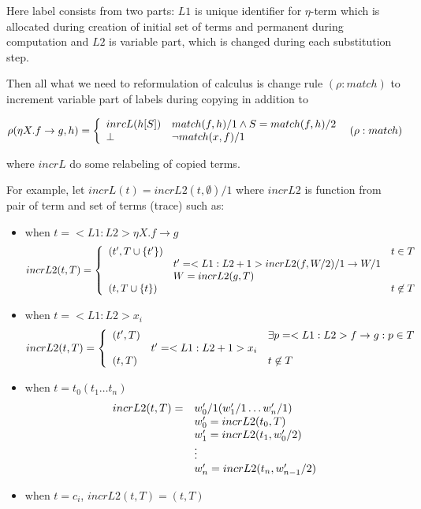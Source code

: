 \documentclass[10pt]{article}
\begin{document}
   Here label consists from two parts: $L1$ is unique identifier for $\eta$-term which is
allocated during creation of initial set of terms and permanent during computation and
$L2$ is variable part, which is changed during each substitution step.
   
 Then all what we need to reformulation of calculus is change rule $(\rho:match)$ to
increment variable part of labels during copying in addition to 

$$
{
 \rho({\eta X. f\to g},h) = \left\{
    \begin{array}{l l}
      inrcL(h[S])  &  match(f,h)/1 \land S=match(f,h)/2  \\
      \bot         & \neg match(x,f)/1 \\       
    \end{array}
    \right.   
}\,\,\,\,{(\rho:match)}  
$$

where $incrL$ do some relabeling of copied terms.

For example, let $incrL(t)=incrL2(t,\emptyset)/1$ where $incrL2$ is function
from pair of term and set of terms (trace) such as:

\begin{itemize}
 \item when $t=<L1:L2>\eta X . f \to g$
$$
 incrL2(t,T) = 
 \left\{
 \begin{array}{l l l}
    (t',T \cup \{t'\}) &  &  t \in T \\
       & t'=<L1:L2+1> incrL2(f,W/2)/1 \to W/1 & \\
       & W=incrL2(g,T) &  \\
    (t, T \cup \{t\}) &  & t \not\in T \\
 \end{array}
 \right.
$$
 \item when $t=<L1:L2>x_{i}$
$$
 incrL2(t,T) = 
 \left\{
 \begin{array}{l l l}
    (t', T) &  & \exists p=<L1:L2>f\to g : p \in T \\
       & t'=<L1:L2+1>x_{i} & \\
    (t,  T) &  & t \not\in T \\
 \end{array}
 \right. 
$$
 \item when $t=t_{0}(t_{1}\dots t_{n})$
 $$
 \begin{array}{ l l }
  incrL2(t,T) = & w'_0/1(w'_1/1 \dots w'_{n}/1) \\
                & w'_0 = incrL2(t_0,T) \\
                & w'_1 = incrL2(t_1,w'_0/2) \\
                & \vdots \\
                & w'_{n} = incrL2(t_{n},w'_{n-1}/2) \\                
 \end{array} 
 $$
 \item when $t=c_{i}$, $incrL2(t,T)=(t,T)$
 \end{itemize}
\end{document}
